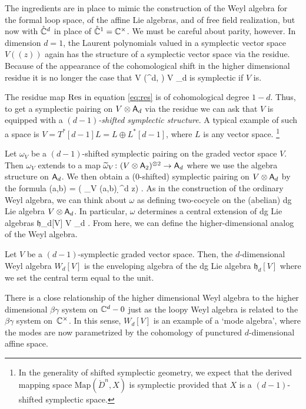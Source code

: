 \documentclass[11pt]{amsart}
\def\til{\Tilde}
\def\lie#1{\ensuremath{\mathfrak{#1}}}
\begin{document}
The ingredients are in place to mimic the construction of the Weyl algebra for the formal loop space, of the affine Lie algebras, and of free field realization, but now with $\mathring{\mathbb C}^d$ in place of $\mathring{\mathbb C}^1 = \mathbb C^\times$.
We must be careful about parity, however. 
In dimension $d = 1$, the Laurent polynomials valued in a symplectic vector space $V((z))$ again has the structure of a symplectic vector space via the residue. 
Because of the appearance of the cohomological shift in the higher dimensional residue it is no longer the case that 
\beqn
V \otimes \RR\Gamma(^d, \cO) \simeq V \otimes \sfA_d
\eeqn
is symplectic if $V$ is.

The residue map ${\rm Res}$ in equation \eqref{eq:res} is of cohomological degree $1-d$. 
Thus, to get a symplectic pairing on $V \otimes \mathsf A_d$ via the residue we can ask that $V$ is equipped with a {\em $(d-1)$-shifted symplectic structure}. 
A typical example of such a space is $V = T^*[d-1] L = L \oplus L^*[d-1]$, where $L$ is any vector space.
\footnote{In the generality of shifted symplectic geometry, we expect that the derived mapping space $\text{Map}(\mathring{D}^n, X)$ is symplectic provided that $X$ is a $(d-1)$-shifted symplectic space.}

Let $\omega_V$ be a $(d-1)$-shifted symplectic pairing on the graded vector space $V$. 
Then $\omega_V$ extends to a map $\til \omega_V \colon (V \otimes \sfA_2)^{\otimes 2} \to \sfA_d$ where we use the algebra structure on $\mathsf A_d$. 
We then obtain a ($0$-shifted) symplectic pairing on $V \otimes \mathsf A_d$ by the formula
\beqn
\label{eqn:omega}
\omega(a,b) = \Res ( \til \omega_V (a,b) \wedge \d^d z) .
\eeqn
As in the construction of the ordinary Weyl algebra, we can think about $\omega$ as defining two-cocycle on the (abelian) dg Lie algebra $V \otimes \mathsf A_d$.
In particular, $\omega$ determines a central extension of dg Lie algebras
\beqn
\CC \to \lie{h}_d[V] \to V \otimes \sfA_d .
\eeqn
From here, we can define the higher-dimensional analog of the Weyl algebra. 

\begin{dfn}
Let $V$ be a $(d-1)$-symplectic graded vector space. 
Then, the $d$-dimensional Weyl algebra $W_d[V]$ is the enveloping algebra of the dg Lie algebra $\lie{h}_d [V]$ where we set the central term equal to the unit.
\end{dfn}

There is a close relationship of the higher dimensional Weyl algebra to the higher dimensional $\beta\gamma$ system on $\mathbb C^d - 0$ just as the loopy Weyl algebra is related to the $\beta\gamma$ system on~$\mathbb C^\times$.
In this sense, $W_d[V]$ is an example of a `mode algebra', where the modes are now parametrized by the cohomology of punctured $d$-dimensional affine space.
\end{document}
